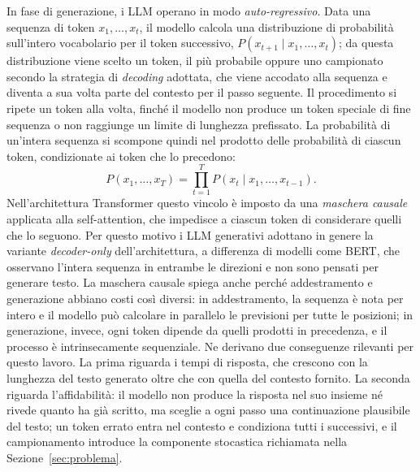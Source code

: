 In fase di generazione, i LLM operano in modo \emph{auto-regressivo}. Data una sequenza di token $x_1, \dots, x_t$, il modello calcola una distribuzione di probabilità sull'intero vocabolario per il token successivo, $P(x_{t+1} \mid x_1, \dots, x_t)$; da questa distribuzione viene scelto un token, il più probabile oppure uno campionato secondo la strategia di \emph{decoding} adottata, che viene accodato alla sequenza e diventa a sua volta parte del contesto per il passo seguente. Il procedimento si ripete un token alla volta, finché il modello non produce un token speciale di fine sequenza o non raggiunge un limite di lunghezza prefissato. La probabilità di un'intera sequenza si scompone quindi nel prodotto delle probabilità di ciascun token, condizionate ai token che lo precedono:
\begin{equation}
  P(x_1, \dots, x_T) = \prod_{t=1}^{T} P(x_t \mid x_1, \dots, x_{t-1}).
  \label{eq:autoregressivo}
\end{equation}
Nell'architettura Transformer questo vincolo è imposto da una \emph{maschera causale} applicata alla self-attention, che impedisce a ciascun token di considerare quelli che lo seguono. Per questo motivo i LLM generativi adottano in genere la variante \emph{decoder-only} dell'architettura, a differenza di modelli come BERT, che osservano l'intera sequenza in entrambe le direzioni e non sono pensati per generare testo. La maschera causale spiega anche perché addestramento e generazione abbiano costi così diversi: in addestramento, la sequenza è nota per intero e il modello può calcolare in parallelo le previsioni per tutte le posizioni; in generazione, invece, ogni token dipende da quelli prodotti in precedenza, e il processo è intrinsecamente sequenziale. Ne derivano due conseguenze rilevanti per questo lavoro. La prima riguarda i tempi di risposta, che crescono con la lunghezza del testo generato oltre che con quella del contesto fornito. La seconda riguarda l'affidabilità: il modello non produce la risposta nel suo insieme né rivede quanto ha già scritto, ma sceglie a ogni passo una continuazione plausibile del testo; un token errato entra nel contesto e condiziona tutti i successivi, e il campionamento introduce la componente stocastica richiamata nella Sezione~\ref{sec:problema}.

